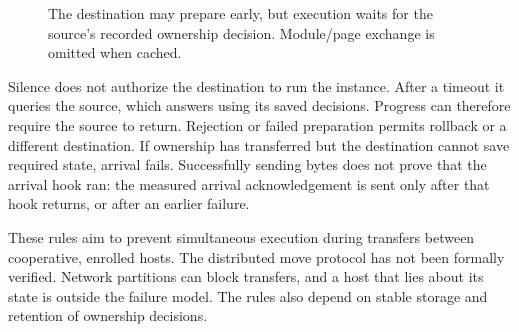 \begin{figure}[tb]
\centering
{}
\caption{The destination may prepare early, but execution waits for the
source's recorded ownership decision. Module/page exchange is omitted when cached.}
\label{fig:movement-protocol}
\end{figure}

Silence does not authorize the destination to run the instance. After a
timeout it queries the source, which answers using its saved decisions.
Progress can therefore require the source to return. Rejection or failed
preparation permits rollback or a different destination. If ownership
has transferred but the destination cannot save required state, arrival
fails. Successfully sending bytes does not prove that the arrival hook
ran: the measured arrival acknowledgement is sent only after that hook
returns, or after an earlier failure.

These rules aim to prevent simultaneous execution during transfers
between cooperative, enrolled hosts. The distributed move protocol has
not been formally verified. Network partitions can block transfers, and
a host that lies about its state is outside the failure model. The rules
also depend on stable storage and retention of ownership decisions.
